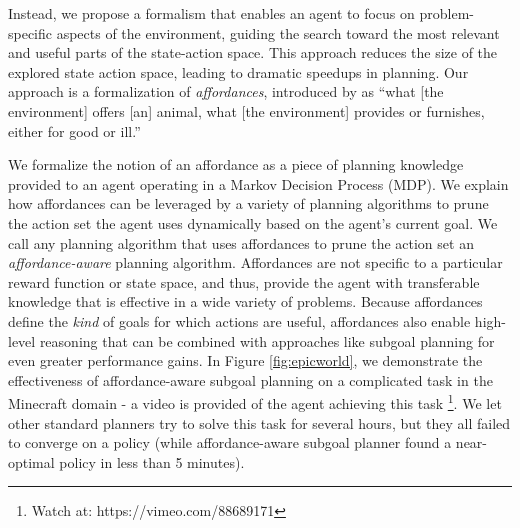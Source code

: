 \documentclass[]{article}
\begin{document}
Instead, we propose a formalism that enables an agent to focus on
problem-specific aspects of the environment, guiding the search toward
the most relevant and useful parts of the state-action space.  This
approach reduces the size of the explored state action space, leading
to dramatic speedups in planning.  Our approach is a formalization of
{\em affordances}, introduced by \citet{gibson77} as ``what [the
  environment] offers [an] animal, what [the environment] provides or
furnishes, either for good or ill.''
      
      We formalize the notion of an affordance as a piece of planning
      knowledge provided to an agent operating in a Markov Decision
      Process (MDP). We explain how affordances can be leveraged by a
      variety of planning algorithms to prune the action set the agent
      uses dynamically based on the agent's current goal.  We call any
      planning algorithm that uses affordances to prune the action set
      an {\it affordance-aware} planning algorithm.  Affordances are
      not specific to a particular reward function or state space, and thus,
      provide the agent with transferable knowledge that is effective
      in a wide variety of problems. Because affordances
      define the {\em kind} of goals for which actions are useful,
      affordances also enable high-level reasoning that can
      be combined with approaches like subgoal planning for even
      greater performance gains. In Figure \ref{fig:epicworld}, we demonstrate the effectiveness of
      affordance-aware subgoal planning on a complicated task
      in the Minecraft domain - a video is provided of the agent achieving this task \footnote{Watch at: https://vimeo.com/88689171}.
      We let other standard planners try to solve this task for several hours, but they all failed
      to converge on a policy (while affordance-aware subgoal planner found a near-optimal
      policy in less than 5 minutes).



\end{document}
